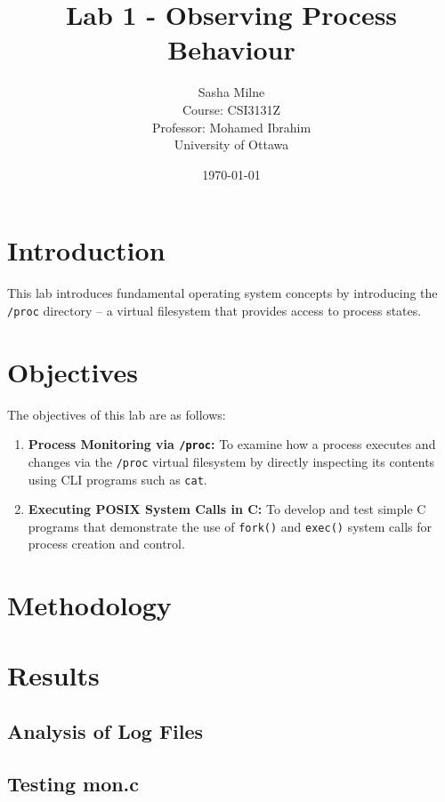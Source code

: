 \documentclass[12pt]{article}
\title{Lab 1 - Observing Process Behaviour}
\author{
    Sasha Milne \\
    Course: CSI3131Z \\
    Professor: Mohamed Ibrahim \\
    University of Ottawa
}
\date{\today}
\begin{document}
\maketitle


\section{Introduction}\label{sec:introduction}

This lab introduces fundamental operating system concepts by introducing the
\texttt{/proc} directory --
a virtual filesystem that provides access to process states.


\section{Objectives}\label{sec:objectives}

The objectives of this lab are as follows:

\begin{enumerate}
    \item \textbf{Process Monitoring via \texttt{/proc}:}
    To examine how a process executes and changes via the \texttt{/proc}
    virtual filesystem by directly inspecting its contents using CLI programs
    such as \texttt{cat}.
    \item \textbf{Executing POSIX System Calls in C:}
    To develop and test simple C programs that demonstrate the use of
    \texttt{fork()} and \texttt{exec()} system calls for process creation and control.
\end{enumerate}

\section{Methodology}\label{sec:methodology}


\section{Results}\label{sec:results}
\subsection{Analysis of Log Files}\label{subsec:analysis-of-log-files}
\subsection{Testing mon.c}\label{subsec:testing-mon.c}
\end{document}
